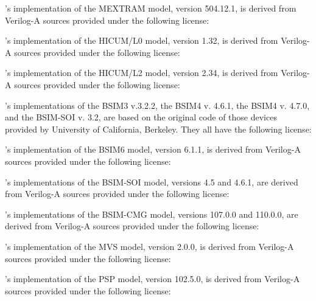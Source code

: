 \Xyce{}'s implementation of the MEXTRAM model, version 504.12.1, is derived
from Verilog-A sources provided under the following license:


\Xyce{}'s implementation of the HICUM/L0 model, version 1.32, is derived from
Verilog-A sources provided under the following license:


\Xyce{}'s implementation of the HICUM/L2 model, version 2.34, is derived from
Verilog-A sources provided under the following license:


\Xyce{}'s implementations of the BSIM3 v.3.2.2, the BSIM4 v. 4.6.1,
the BSIM4 v. 4.7.0, and the BSIM-SOI v. 3.2, are based on the original code of
those devices provided by University of California, Berkeley.  They all have
the following license:


\Xyce{}'s implementation of the BSIM6 model, version 6.1.1, is derived from
Verilog-A sources provided under the following license:


\Xyce{}'s implementations of the BSIM-SOI model, versions 4.5 and 4.6.1, are
derived from Verilog-A sources provided under the following license:


\Xyce{}'s implementations of the BSIM-CMG model, versions 107.0.0 and 110.0.0,
are derived from Verilog-A sources provided under the following license:


\Xyce{}'s implementation of the MVS model, version 2.0.0, is derived from
Verilog-A sources provided under the following license:


\Xyce{}'s implementation of the PSP model, version 102.5.0, is derived from
Verilog-A sources provided under the following license:


